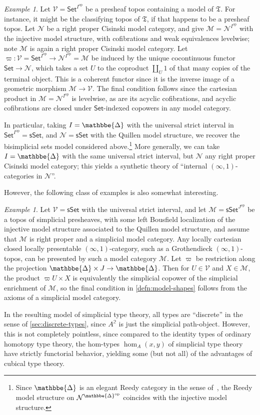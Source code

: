 \documentclass[12pt]{amsart}
\theoremstyle{plain}
\theoremstyle{definition}
\theoremstyle{remark}
\newtheorem{ex}[thm]{Example}
\numberwithin{equation}{section}
\newcommand{\two}{\mathbb{2}}
\newcommand{\Set}{\mathsf{Set}}
\newcommand{\sSet}{\mathsf{sSet}}
\newcommand{\DDelta}{\mathbbe{\Delta}}
\newcommand{\op}{\mathrm{op}}
\newcommand{\M}{\mathcal{M}}
\newcommand{\N}{\mathcal{N}}
\newcommand{\V}{\mathcal{V}}
\newcommand{\fT}{\mathfrak{T}}
\begin{document}
\begin{ex}\label{thm:model-shapes}
  Let $\V = \Set^{I^\op}$ be a presheaf topos containing a model of $\fT$.
  For instance, it might be the classifying topos of $\fT$, if that happens to be a presheaf topos.
  Let $\N$ be a right proper Cisinski model category, and give $\M = \N^{I^\op}$ with the injective model structure, with cofibrations and weak equivalences levelwise; note $\M$ is again a right proper Cisinski model category.
 Let $\varpi : \V = \Set^{I^\op} \to \N^{I^\op}= \M$ be induced by the unique cocontinuous functor $\Set\to\N$, which takes a set $U$ to the coproduct $\coprod_U 1$ of that many copies of the terminal object.
    This is a coherent functor since it is the inverse image of a geometric morphism $\M\to\V$.
    The final condition follows since the cartesian product in $\M = \N^{I^\op}$ is levelwise, as are its acyclic cofibrations, and acyclic cofibrations are closed under $\Set$-indexed copowers in any model category.

  In particular, taking $I= \DDelta$ with the universal strict interval in $\Set^{I^\op} = \sSet$, and $\N = \sSet$ with the Quillen model structure, we recover the bisimplicial sets model considered above.\footnote{Since $\DDelta$ is an elegant Reedy category in the sense of~\cite{BR}, the Reedy model structure on $\N^{\DDelta^\op}$ coincides with the injective model structure.}
  More generally, we can take $I= \DDelta$ with the same universal strict interval, but $\N$ any right proper Cisinski model category; this yields a synthetic theory of ``internal $(\infty,1)$-categories in $\N$''.
\end{ex}

However, the following class of examples is also somewhat interesting.

\begin{ex}\label{thm:model-discrete}
  Let $\V = \sSet$ with the universal strict interval, and let $\M = \sSet^{J^\op}$ be a topos of simplicial presheaves, with some left Bousfield localization of the injective model structure associated to the Quillen model structure, and assume that $\M$ is right proper and a simplicial model category.
  Any locally cartesian closed locally presentable $(\infty,1)$-category, such as a Grothendieck $(\infty,1)$-topos, can be presented by such a model category $\M$.
 Let $\varpi$ be restriction along the projection $\DDelta \times J \to \DDelta$.
  Then for $U\in\V$ and $X\in \M$, the product ${\varpi U}\times X$ is equivalently the simplicial copower of the simplicial enrichment of $\M$, so the final condition in \cref{defn:model-shapes} follows from the axioms of a simplicial model category.

  In the resulting model of simplicial type theory, all types are ``discrete'' in the sense of \cref{sec:discrete-types}, since $A^\two$ is just the simplicial path-object.
  However, this is not completely pointless, since compared to the identity types of ordinary homotopy type theory, the hom-types $\hom_A(x,y)$ of simplicial type theory have strictly functorial behavior, yielding some (but not all) of the advantages of cubical type theory.
\end{ex}
\end{document}
